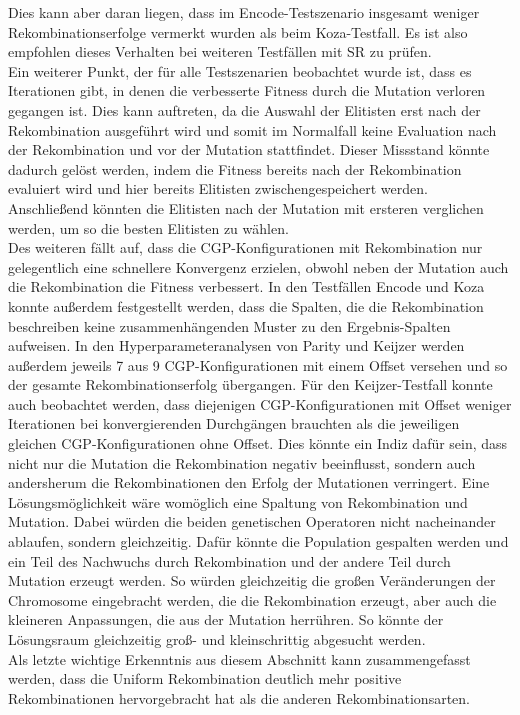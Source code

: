 Dies kann aber daran liegen, dass im Encode-Testszenario insgesamt weniger Rekombinationserfolge vermerkt wurden als beim Koza-Testfall.
Es ist also empfohlen dieses Verhalten bei weiteren Testfällen mit SR zu prüfen.\\
Ein weiterer Punkt, der für alle Testszenarien beobachtet wurde ist, dass es Iterationen gibt, in denen die verbesserte Fitness durch die Mutation verloren gegangen ist.
Dies kann auftreten, da die Auswahl der Elitisten erst nach der Rekombination ausgeführt wird und somit im Normalfall keine Evaluation nach der Rekombination und vor der Mutation stattfindet.
Dieser Missstand könnte dadurch gelöst werden, indem die Fitness bereits nach der Rekombination evaluiert wird und hier bereits Elitisten zwischengespeichert werden.
Anschließend könnten die Elitisten nach der Mutation mit ersteren verglichen werden, um so die besten Elitisten zu wählen.\\
Des weiteren fällt auf, dass die CGP-Konfigurationen mit Rekombination nur gelegentlich eine schnellere Konvergenz erzielen, obwohl neben der Mutation auch die Rekombination die Fitness verbessert.
In den Testfällen Encode und Koza konnte außerdem festgestellt werden, dass die Spalten, die die Rekombination beschreiben keine zusammenhängenden Muster zu den Ergebnis-Spalten aufweisen.
In den Hyperparameteranalysen von Parity und Keijzer werden außerdem jeweils 7 aus 9 CGP-Konfigurationen mit einem Offset versehen und so der gesamte Rekombinationserfolg übergangen.
Für den Keijzer-Testfall konnte auch beobachtet werden, dass diejenigen CGP-Konfigurationen mit Offset weniger Iterationen bei konvergierenden Durchgängen brauchten als die jeweiligen gleichen CGP-Konfigurationen ohne Offset.
Dies könnte ein Indiz dafür sein, dass nicht nur die Mutation die Rekombination negativ beeinflusst, sondern auch andersherum die Rekombinationen den Erfolg der Mutationen verringert.
Eine Lösungsmöglichkeit wäre womöglich eine Spaltung von Rekombination und Mutation.
Dabei würden die beiden genetischen Operatoren nicht nacheinander ablaufen, sondern gleichzeitig.
Dafür könnte die Population gespalten werden und ein Teil des Nachwuchs durch Rekombination und der andere Teil durch Mutation erzeugt werden.
So würden gleichzeitig die großen Veränderungen der Chromosome eingebracht werden, die die Rekombination erzeugt, aber auch die kleineren Anpassungen, die aus der Mutation herrühren.
So könnte der Lösungsraum gleichzeitig groß- und kleinschrittig abgesucht werden.\\
Als letzte wichtige Erkenntnis aus diesem Abschnitt kann zusammengefasst werden, dass die Uniform Rekombination deutlich mehr positive Rekombinationen hervorgebracht hat als die anderen Rekombinationsarten.
